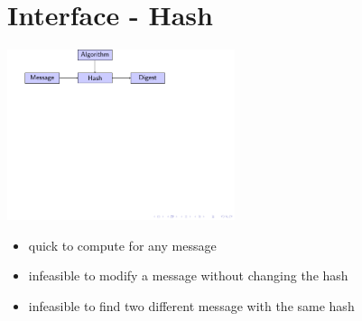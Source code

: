 \section{Interface - Hash}


\begin{frame}


\includegraphics[trim=0.5cm 4cm 14cm 0cm, height=5cm]{figures/hash.pdf}


\begin{itemize}
  \item quick to compute for any message
  \item infeasible to modify a message without changing the hash
  \item infeasible to find two different message with the same hash
\end{itemize}


\end{frame}
